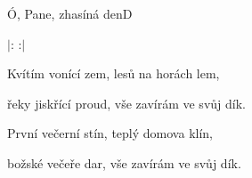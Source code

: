 \setcounter{page}{110}
\begin{song}{Ó, Pane, zhasíná den}{D}{}

\begin{SBChorus}

$|$:  :$|$

\end{SBChorus}

\begin{SBVerse}



\end{SBVerse}

\begin{SBVerse}

Kvítím vonící zem, lesů na horách lem,

řeky jiskřící proud, vše zavírám ve svůj dík.

\end{SBVerse}

\begin{SBVerse}

První večerní stín, teplý domova klín,

božské večeře dar, vše zavírám ve svůj dík.

\end{SBVerse}

\end{song}

